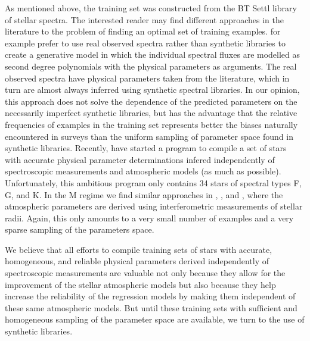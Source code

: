 As mentioned above, the training set was constructed from the BT Settl
library of stellar spectra. The interested reader may find different
approaches in the literature to the problem of finding an optimal set
of training examples. \cite{hoggCannon} for example prefer to use real
observed spectra rather than synthetic libraries to create a
generative model in which the individual spectral fluxes are modelled
as second degree polynomials with the physical parameters as
arguments. The real observed spectra have physical parameters taken
from the literature, which in turn are almost always inferred using
synthetic spectral libraries. In our opinion, this approach does not
solve the dependence of the predicted parameters on the necessarily
imperfect synthetic libraries, but has the advantage that the relative
frequencies of examples in the training set represents better the
biases naturally encountered in surveys than the uniform sampling of
parameter space found in synthetic libraries. Recently, \cite{heiter}
have started a program to compile a set of stars with accurate
physical parameter determinations infered independently of
spectroscopic measurements and atmospheric models (as much as
possible). Unfortunately, this ambitious program only contains 34
stars of spectral types F, G, and K. In the M regime we find similar
approaches in \cite{dummy}, \cite{dummy}, and \cite{dummy}, where the
atmospheric parameters are derived using interferometric measurements
of stellar radii. Again, this only amounts to a very small number of
examples and a very sparse sampling of the parameters space.

We believe that all efforts to compile training sets of stars with
accurate, homogeneous, and reliable physical parameters derived
independently of spectroscopic measurements are valuable not only
because they allow for the improvement of the stellar atmospheric
models but also because they help increase the reliability of the
regression models by making them independent of these same atmospheric
models. But until these training sets with sufficient and homogeneous
sampling of the parameter space are available, we turn to the use of
synthetic libraries. 

